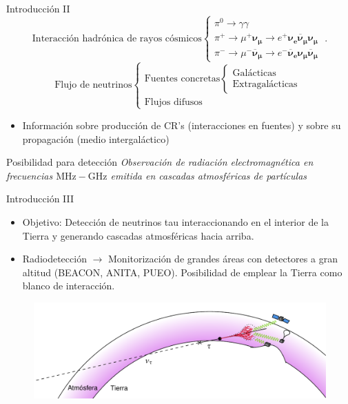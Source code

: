 \documentclass{beamer}
\begin{document}
\begin{frame}{Introducción II}
		\begin{equation*}
		\text{Interacción hadrónica de rayos cósmicos}\left\{\begin{array}{l}\pi^0\rightarrow \gamma\gamma\\\pi^+\rightarrow \mu^+ \bm{\nu_\mu}\rightarrow e^+ \bm{\nu_e \overline{\nu}_\mu \nu_\mu}\\ \pi^-\rightarrow \mu^- \bm{\overline{\nu}_\mu}\rightarrow e^- \bm{\overline{\nu}_e \nu_\mu \overline{\nu}_\mu}\end{array}\right.\;.\label{ec11}
	\end{equation*}
	\pause\begin{equation*}
		\text{Flujo de neutrinos}\left\{\begin{array}{l}\text{Fuentes concretas}\left\{\begin{array}{l}\text{Galácticas}\\\text{Extragalácticas}\end{array}\right.\\\text{Flujos difusos}\end{array}\right.
	\end{equation*}

\begin{itemize}
	\item Información sobre producción de CR's (interacciones en fuentes) y sobre su propagación (medio intergaláctico)
\end{itemize}
\pause\begin{block}{\centering Posibilidad para detección}
	\centering \textit{Observación de radiación electromagnética en frecuencias $\mathrm{MHz-GHz}$ emitida en cascadas atmosféricas de partículas}
	\end{block}
\end{frame}
\begin{frame}{Introducción III}
	\begin{itemize}
		\item Objetivo: Detección de neutrinos tau interaccionando en el interior de la Tierra y generando cascadas atmosféricas hacia arriba. 
		\item Radiodetección $\rightarrow$ Monitorización de grandes áreas con detectores a gran altitud (BEACON, ANITA, PUEO). Posibilidad de emplear la Tierra como blanco de interacción.
	\end{itemize}
	\begin{figure}[H]
	\centering
	\includegraphics[width=1\linewidth]{figures/shower_up_v2}
	\end{figure}
\end{frame}
\end{document}
